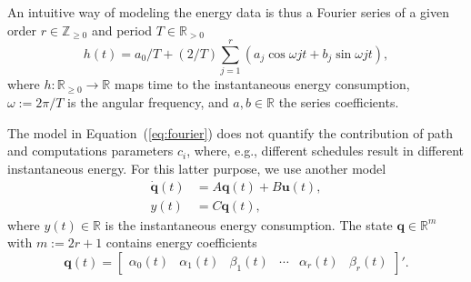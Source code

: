 \documentclass[letterpaper,10pt,journal,twoside]{IEEEtran}
\theoremstyle{definition}
\begin{document}



An intuitive way of modeling the energy data is thus a Fourier series of a given order $r\in\mathbb{Z}_{\geq 0}$ and period $T\in\mathbb{R}_{>0}$
\begin{equation}\label{eq:fourier}
  h(t)=a_0/T+(2/T)\sum_{j=1}^{r}{\left(a_j\cos{\omega jt}+b_j\sin{\omega jt}\right)},
\end{equation}
where $h:\mathbb{R}_{\geq 0}\rightarrow\mathbb{R}$ maps time to the instantaneous energy consumption, $\omega:=2\pi/T$ is the angular frequency, and $a,b\in\mathbb{R}$ the series coefficients.

The model in Equation~(\ref{eq:fourier}) does not quantify the contribution of path and computations parameters $c_i$, where, e.g., different schedules result in different instantaneous energy. For this latter purpose, we use another model
\begin{subequations}\label{eq:state-perf}\begin{align}
  \dot{\mathbf{q}}(t)&=A\mathbf{q}(t)+B\mathbf{u}(t),\label{eq:state-perf-q}\\
  y(t)&=C\mathbf{q}(t),\label{eq:state-perf-y}
\end{align}\end{subequations}
where $y(t)\in\mathbb{R}$ is the instantaneous energy consumption. The state $\mathbf{q}\in\mathbb{R}^m$ with $m:=2r+1$ contains energy coefficients
\begin{equation}
  \mathbf{q}(t)=\begin{bmatrix}
    \alpha_0(t) & \alpha_1(t) & \beta_1(t) & \cdots & \alpha_r(t) & \beta_r(t)
  \end{bmatrix}'.
\end{equation}
\end{document}
